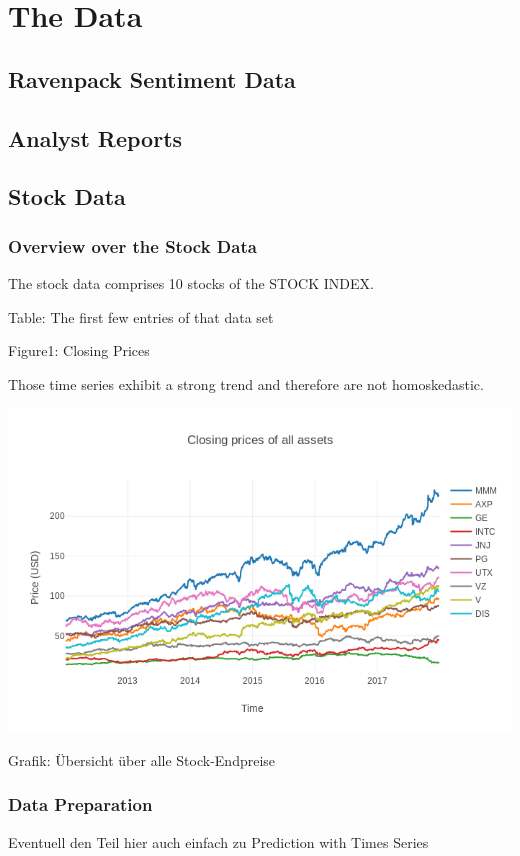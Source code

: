 \chapter{The Data}

\section{Ravenpack Sentiment Data}


\section{Analyst Reports}


\section{Stock Data}
\subsection{Overview over the Stock Data}
The stock data comprises 10 stocks of the STOCK INDEX. 

Table: The first few entries of that data set

Figure1: Closing Prices

Those time series exhibit a strong trend and therefore are not homoskedastic. 



\includegraphics[width=0.9\linewidth]{figures/closing_prices_10_assets.png}

Grafik: Übersicht über alle Stock-Endpreise





\subsection{Data Preparation}
Eventuell den Teil hier auch einfach zu Prediction with Times Series
